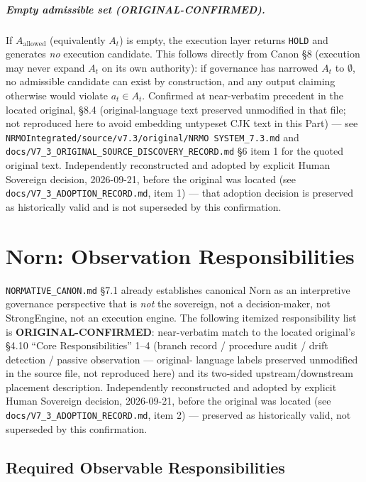 \paragraph{Empty admissible set (\textbf{ORIGINAL-CONFIRMED}).} If
$A_{\mathrm{allowed}}$ (equivalently
$A_t$) is empty, the execution layer returns \texttt{HOLD} and
generates \emph{no} execution candidate. This follows directly from
Canon \S8 (execution may never expand $A_t$ on its own authority): if
governance has narrowed $A_t$ to $\emptyset$, no admissible candidate
can exist by construction, and any output claiming otherwise would
violate $a_t \in A_t$. Confirmed at near-verbatim precedent in the
located original, \S8.4 (original-language text preserved unmodified in
that file; not reproduced here to avoid embedding untypeset CJK text in
this Part) --- see
\texttt{NRMOIntegrated/source/v7.3/original/NRMO SYSTEM\_7.3.md} and
\texttt{docs/V7\_3\_ORIGINAL\_SOURCE\_DISCOVERY\_RECORD.md} \S6 item 1
for the quoted original text.
Independently reconstructed and adopted by explicit Human Sovereign
decision, 2026-09-21, before the original was located (see
\texttt{docs/V7\_3\_ADOPTION\_RECORD.md}, item 1) --- that adoption
decision is preserved as historically valid and is not superseded by
this confirmation.

\chapter{Norn: Observation Responsibilities}
\label{ch:v73-norn}

\texttt{NORMATIVE\_CANON.md} \S7.1 already establishes canonical Norn
as an interpretive governance perspective that is \emph{not} the
sovereign, not a decision-maker, not StrongEngine, not an execution
engine. The following itemized responsibility list is
\textbf{ORIGINAL-CONFIRMED}: near-verbatim match to the located
original's \S4.10 ``Core Responsibilities'' 1--4 (branch record /
procedure audit / drift detection / passive observation --- original-
language labels preserved unmodified in the source file, not
reproduced here) and its two-sided upstream/downstream placement
description. Independently reconstructed and adopted by explicit Human
Sovereign decision, 2026-09-21, before the original was located (see
\texttt{docs/V7\_3\_ADOPTION\_RECORD.md}, item 2) --- preserved as
historically valid, not superseded by this confirmation.

\section{Required Observable Responsibilities}

